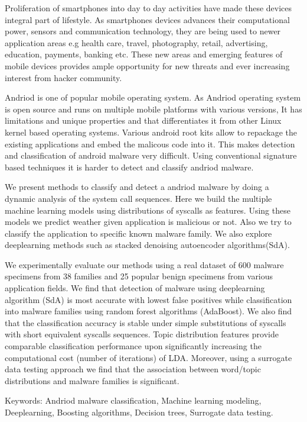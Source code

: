 \begin{flushleft}
\begin{singlespace}

Proliferation of smartphones into day to day activities have made these devices integral part of lifestyle. As smartphones devices advances their computational power, sensors and communication technology, they are being used to newer application areas e.g health care, travel, photography, retail, advertising, education, payments, banking etc. These new areas and emerging features of mobile devices provides ample opportunity for new threats and ever increasing interest from hacker community.

Andriod is one of popular mobile operating system. As Andriod operating system is open source and runs on multiple mobile platforms with various versions, It has limitations and unique properties and that differentiates it from other Linux kernel based operating systems. Various android root kits allow to repackage the existing applications and embed the malicous code into it. This makes detection and classification of android malware very difficult. Using conventional signature based techniques it is harder to detect and classify andriod malware.

We present methods to classify and detect a andriod malware by doing a dynamic analysis of the system call sequences. Here we build the multiple machine learning models using distributions of syscalls as features. Using these models we predict weather given application is malicious or not. Also we try to classify the application to specific known malware family. We also explore deeplearning methods such as stacked denoising autoencoder algorithms(SdA).

We experimentally evaluate our methods using a real dataset of 600 malware specimens from 38 families and 25 popular benign specimens from various application fields. We find that detection of malware using deeplearning algorithm (SdA) is most accurate with lowest false positives while classification into malware families using random forest algorithms (AdaBoost). We also find that the classification accuracy is stable under simple substitutions of syscalls with short equivalent syscalls sequences. 
Topic distribution features provide comparable classification performance upon significantly increasing the computational cost (number of iterations) of LDA.  Moreover, using a surrogate data testing approach we find that the association between word/topic distributions and malware families is significant.

Keywords: Andriod malware classification, Machine learning modeling, Deeplearning, Boosting algorithms, Decision trees, Surrogate
data testing.
\end{singlespace}
\end{flushleft}
\par\vfil

